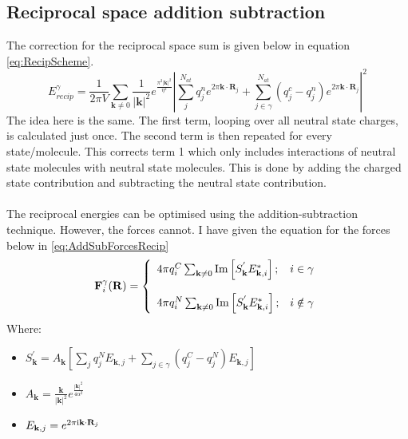\subsection{Reciprocal space addition subtraction}
The correction for the reciprocal space sum is given below in equation \eqref{eq:RecipScheme}.
\begin{equation}
  E^{\gamma}_{recip} = \frac{1}{2 \pi V} \sum_{\mathbf{k} \neq 0} \frac{1}{|\mathbf{k}|^2} e^{\frac{\pi^2 |\mathbf{k}|^2}{\eta^2}} \left| \sum_{j}^{N_{at}} q^{n}_{j} e^{2 \pi \mathbf{k} \cdot \mathbf{R}_{j}}  + \sum_{j \in \gamma}^{N_{at}} (q^{c}_{j} - q^n_j) e^{2 \pi \mathbf{k} \cdot \mathbf{R}_{j}} \right| ^2
  \label{eq:RecipScheme}
\end{equation}
The idea here is the same. The first term, looping over all neutral state charges, is calculated just once. The second term is then repeated for every state/molecule. This corrects term 1 which only includes interactions of neutral state molecules with neutral state molecules. This is done by adding the charged state contribution and subtracting the neutral state contribution.
\\\\
The reciprocal energies can be optimised using the addition-subtraction technique. However, the forces cannot. I have given the equation for the forces below in \eqref{eq:AddSubForcesRecip}
\begin{equation}
    \mathbf{F}_{i}^{\gamma}(\mathbf{R}) =  \left\lbrace \begin{array}{lc}
      4\pi q_{i}^{C} \sum_{\mathbf{k} \neq 0} \mathrm{Im}\left[ S^{'}_{\mathbf{k}} E_{\mathbf{k},i}^{*} \right]; & i  \in \gamma\\\\
    
    4\pi q_{i}^{N} \sum_{\mathbf{k} \neq 0} \mathrm{Im}\left[ S^{'}_{\mathbf{k}} E_{\mathbf{k},i}^{*} \right];& i     \notin \gamma
    \end{array}
    \right.
    \label{eq:AddSubForcesRecip}
\end{equation}
Where:
\begin{itemize}
  \item $S_{\mathbf{k}}^{'} = A_{\mathbf{k}} \left[\sum_{j} q_j^{N} E_{\mathbf{k}, j} + \sum_{j \in \gamma}           \left(q_j^{C} - q_{j}^{N}\right) E_{\mathbf{k}, j}\right]$

  \item $A_{\mathbf{k}} = \frac{\mathbf{k}}{|\mathbf{k}|^2} e^{\frac{|\mathbf{k}|^2}{4 \alpha^2}}$

  \item $E_{\mathbf{k}, j} = e^{2 \pi \mathrm{i} \mathbf{k} \cdot \mathbf{R}_{j}}$
\end{itemize}
